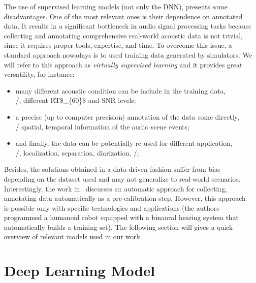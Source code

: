 \mynewline
The use of supervised learning models (not only the \ac{DNN}), presents some disadvantages.
One of the most relevant ones is their dependence on annotated data. It results in a significant bottleneck in audio signal processing tasks because collecting and annotating comprehensive real-world acoustic data is not trivial, since it requires proper tools, expertise, and time.
To overcome this issue, a standard approach nowadays is to used training data generated by simulators.
We will refer to this approach as \textit{virtually supervised learning} and it provides great versatility, for instance:
\begin{itemize}
    \item many different acoustic condition can be include in the training data,\\\eg/, different \acf{RT$_{60}$} and \acf{SNR} levels;
    \item a precise (up to computer precision) annotation of the data come directly,\\\eg/ spatial, temporal information of the audio scene events;
    \item and finally, the data can be potentially re-used for different application,\\\eg/, localization, separation, diarization, \etc/;
\end{itemize}
Besides, the solutions obtained in a data-driven fashion suffer from bias depending on the dataset used and may not generalize to real-world scenarios.
Interestingly, the work in~ discusses an automatic approach for collecting, annotating data automatically as a pre-calibration step.
However, this approach is possible only with specific technologies and applications (the authors programmed a humanoid robot equipped with a binaural hearing system that automatically builds a training set).
The following section will gives a quick overview of relevant models used in our work.

\section{Deep Learning Model}\label{sec:lantern:dnn}

